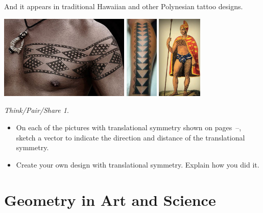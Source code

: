 \documentclass[12pt, reqno]{amsart}
\theoremstyle{remark}
\newtheorem*{thinkpair*}{Think/Pair/Share}
\theoremstyle{definition}
\numberwithin{equation}{section}  %
\begin{document}
\noindent
And it appears in traditional Hawaiian and other Polynesian tattoo designs.

\begin{center}\label{pic:translast}
\includegraphics[height=4cm]{frieze8}
\qquad
\includegraphics[height=4cm]{frieze9}
\qquad
\includegraphics[height=4cm]{frieze10}
\end{center}


\begin{thinkpair*}\ 
\begin{itemize}
\item
On each of the pictures with translational symmetry shown on pages~\pageref{pic:trans1}--\pageref{pic:translast}, sketch a vector to indicate the direction and distance of the translational symmetry.\\

\item
Create your own design with translational symmetry.  Explain how you did it.
\end{itemize}
\end{thinkpair*}


\newpage






\section{Geometry in Art and Science}\label{sec:artsci}
\end{document}
